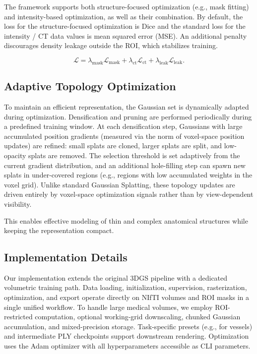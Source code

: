 \documentclass[runningheads]{llncs}
\begin{document}
The framework supports both structure-focused optimization (e.g., mask fitting) and intensity-based optimization, as well as their combination. By default, the loss for the structure-focused optimization is Dice and the standard loss for the intensity / CT data values is mean squared error (MSE). An additional penalty discourages density leakage outside the ROI, which stabilizes training.

\begin{equation}
\mathcal{L} = \lambda_{\mathrm{mask}} \mathcal{L}_{\mathrm{mask}} + \lambda_{\mathrm{ct}} \mathcal{L}_{\mathrm{ct}} + \lambda_{\mathrm{leak}} \mathcal{L}_{\mathrm{leak}}.
\end{equation}

\subsection{Adaptive Topology Optimization}
To maintain an efficient representation, the Gaussian set is dynamically adapted during optimization. Densification and pruning are performed periodically during a predefined training window. At each densification step, Gaussians with large accumulated position gradients (measured via the norm of voxel-space position updates) are refined: small splats are cloned, larger splats are split, and low-opacity splats are removed. The selection threshold is set adaptively from the current gradient distribution, and an additional hole-filling step can spawn new splats in under-covered regions (e.g., regions with low accumulated weights in the voxel grid). Unlike standard Gaussian Splatting, these topology updates are driven entirely by voxel-space optimization signals rather than by view-dependent visibility.

This enables effective modeling of thin and complex anatomical structures while keeping the representation compact.

\subsection{Implementation Details}
Our implementation extends the original 3DGS pipeline \cite{kerbl2023gaussiansplatting} with a dedicated volumetric training path. Data loading, initialization, supervision, rasterization, optimization, and export operate directly on NIfTI volumes and ROI masks in a single unified workflow. To handle large medical volumes, we employ ROI-restricted computation, optional working-grid downscaling, chunked Gaussian accumulation, and mixed-precision storage. Task-specific presets (e.g., for vessels) and intermediate PLY checkpoints support downstream rendering. Optimization uses the Adam optimizer with all hyperparameters accessible as CLI parameters.
\end{document}
